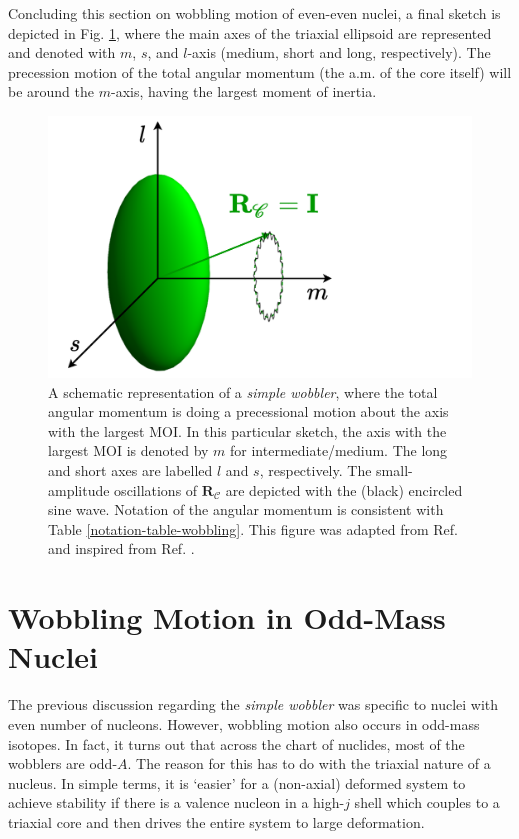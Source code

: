 Concluding this section on wobbling motion of even-even nuclei, a final sketch is depicted in Fig. \ref{simple-wobbler-geometrical-schematic}, where the main axes of the triaxial ellipsoid are represented and denoted with $m$, $s$, and $l$-axis (medium, short and long, respectively). The precession motion of the total angular momentum (the a.m. of the core itself) will be around the $m$-axis, having the largest moment of inertia.
\begin{figure}
    \centering
    \includegraphics[scale=0.6]{Chapters/Figures/simple_wobbler-schematic.pdf}
    \caption{A schematic representation of a \emph{simple wobbler}, where the total angular momentum is doing a precessional motion about the axis with the largest MOI. In this particular sketch, the axis with the largest MOI is denoted by $m$ for intermediate/medium. The long and short axes are labelled $l$ and $s$, respectively. The small-amplitude oscillations of $\mathbf{R}_\mathscr{C}$ are depicted with the (black) encircled sine wave. Notation of the angular momentum is consistent with Table \ref{notation-table-wobbling}. This figure was adapted from Ref. \cite{poenaru2021extensive1} and inspired from Ref. \cite{sensharma2020longitudinal}.}
    \label{simple-wobbler-geometrical-schematic}
\end{figure}

\section{Wobbling Motion in Odd-Mass Nuclei}
\label{section-odd-wobbling-theory}

The previous discussion regarding the \emph{simple wobbler} was specific to nuclei with even number of nucleons. However, wobbling motion also occurs in odd-mass isotopes. In fact, it turns out that across the chart of nuclides, most of the wobblers are odd-$A$. The reason for this has to do with the triaxial nature of a nucleus. In simple terms, it is `easier' for a (non-axial) deformed system to achieve stability if there is a valence nucleon in a high-$j$ shell which couples to a triaxial core and then drives the entire system to large deformation.

